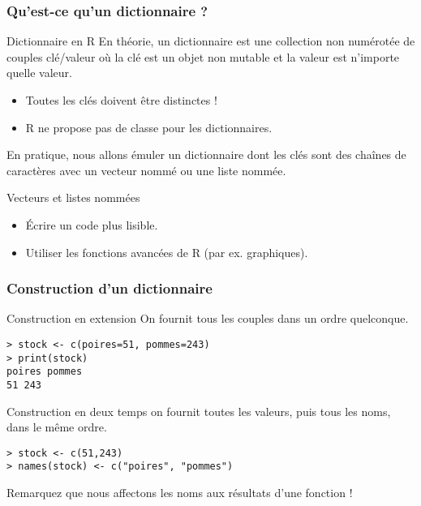 \documentclass[10pt]{beamer}
\begin{document}
\begin{frame}
  \frametitle{Qu'est-ce qu'un dictionnaire ?}

  \begin{alertblock}{Dictionnaire en R}
    En théorie, un dictionnaire est une collection non numérotée de couples clé/valeur où la clé est un objet non mutable et la valeur est n'importe quelle valeur.
    \begin{itemize}
    \item Toutes les clés doivent être distinctes !
    \item R ne propose pas de classe pour les dictionnaires.
    \end{itemize}
    En pratique, nous allons \alert{émuler un dictionnaire} dont les clés sont des chaînes de caractères avec un \alert{vecteur nommé} ou une \alert{liste nommée}.
  \end{alertblock}

  \begin{block}{Vecteurs et listes nommées}
    \begin{itemize}
    \item Écrire un code plus lisible.
    \item Utiliser les fonctions avancées de R (par ex. graphiques).
    \end{itemize}

  \end{block}
\end{frame}


\begin{frame}[fragile]
  \frametitle{Construction d'un dictionnaire}

\begin{block}{Construction en extension}
  On fournit tous les couples dans un ordre quelconque.
    \begin{lstlisting}[style=block]
> stock <- c(poires=51, pommes=243)
> print(stock)
poires pommes
51 243
\end{lstlisting}
  \end{block}

  \begin{block}{Construction en deux temps}
    on fournit toutes les valeurs, puis tous les noms, dans le même ordre.
    \begin{lstlisting}[style=block]
> stock <- c(51,243)
> names(stock) <- c("poires", "pommes")
\end{lstlisting}
Remarquez que nous affectons les noms aux résultats d'une fonction !
\end{block}
\end{frame}
\end{document}
